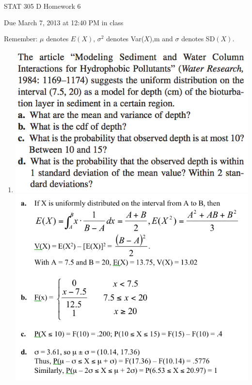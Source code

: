 \documentclass{article}\usepackage{graphicx, color}
\numberwithin{equation}{section}
\begin{document}
\begin{flushleft}
\begin{center} \LARGE
STAT 305 D Homework 6
\end{center}
\begin{center} \Large
Due March 7, 2013 at 12:40 PM in class
\end{center}
\color{red}
Remember: $\mu$ denotes $E(X)$, $\sigma^2$ denotes Var($X$),m and $\sigma$ denotes SD$(X)$.\color{black}
\normalsize


\begin{enumerate}[1. ]

\item 
{} \includegraphics{../../fig/h6p1.png}
 \includegraphics{../../fig/h6p1sol.png}


\end{enumerate}
\end{flushleft}
\end{document}
